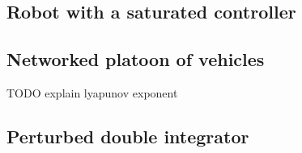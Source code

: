 \subsection{Robot with a saturated controller}


\subsection{Networked platoon of vehicles}

{\color{red} TODO explain lyapunov exponent}

\subsection{Perturbed double integrator}


